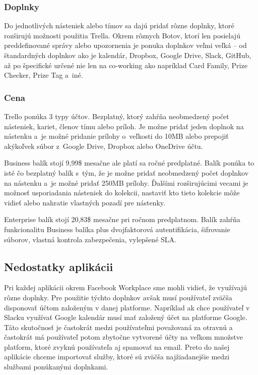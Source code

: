 \subsubsection{Doplnky}
\indent Do jednotlivých násteniek alebo tímov sa dajú pridať rôzne doplnky, ktoré rozširujú možnosti použitia Trella. Okrem rôznych Botov, ktorí len posielajú preddefinované správy alebo upozornenia je ponuka doplnkov veľmi veľká – od štandardných doplnkov ako je kalendár, Dropbox, Google Drive, Slack, GitHub, až po špecifické určené nie len na co-working ako napríklad Card Family, Prize Checker, Prize Tag a iné. 
\subsubsection{Cena}
\indent Trello ponúka 3 typy účtov. Bezplatný, ktorý zahŕňa neobmedzený počet násteniek, kariet, členov tímu alebo príloh. Je možne pridať jeden doplnok na nástenku a je možné pridanie prílohy o veľkosti do 10MB alebo prepojiť akýkoľvek súbor z Google Drive, Dropbox alebo OneDrive účtu. 

\indent Business balík stojí 9,99\$ mesačne ale platí sa ročné predplatné. Balík ponúka to isté čo bezplatný balík s tým, že je možne pridať neobmedzený počet doplnkov na nástenku a je možné pridať 250MB prílohy. Ďalšími rozširujúcimi vecami je možnosť usporiadania násteniek do kolekcii, nastaviť kto tieto kolekcie môže vidieť alebo nahratie vlastných pozadí pre nástenky. 

\indent Enterprise balík stojí 20,83\$ mesačne pri ročnom predplatnom. Balík zahŕňa funkcionalitu Business balíka plus dvojfaktorová autentifikácia, šifrovanie súborov, vlastná kontrola zabezpečenia, vylepšené SLA. 

\subsection{Nedostatky aplikácii}
\indent Pri každej aplikácii okrem Facebook Workplace sme mohli vidieť, že využívajú rôzne doplnky. Pre použitie týchto doplnkov avšak musí používateľ zväčša disponovať účtom založeným v danej platforme. Napríklad ak chce používateľ v Slacku využívať Google kalendár musí mať založený účet na platforme Google. Táto skutočnosť je častokrát medzi používateľmi považovaná za otravnú a častokrát má používateľ potom zbytočne vytvorené účty na veľkom množstve platform, ktoré zvyknú používateľa aj spamovať na email. Preto do našej aplikácie chceme importovať služby, ktoré sú zväčša najžiadanejšie medzi službami ponúkanými doplnkami. 

